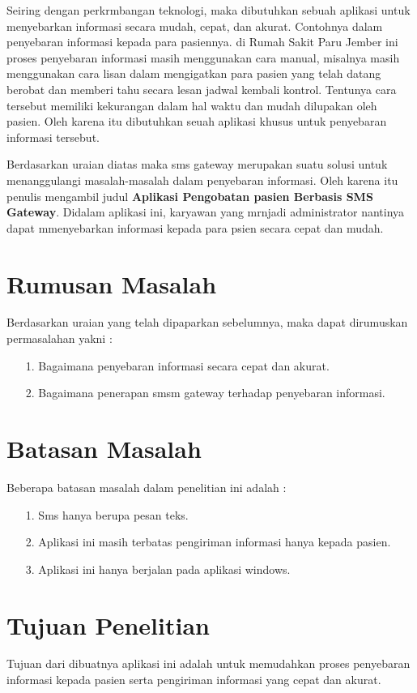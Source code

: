 \documentclass{jtetiproposalskripsi}
\begin{document}
Seiring dengan perkrmbangan teknologi, maka dibutuhkan sebuah aplikasi untuk menyebarkan informasi secara mudah, cepat, dan akurat. Contohnya dalam penyebaran informasi kepada para pasiennya. di Rumah Sakit Paru Jember ini proses penyebaran informasi masih menggunakan cara manual, misalnya masih menggunakan cara lisan dalam mengigatkan para pasien yang telah datang berobat dan memberi tahu secara lesan jadwal kembali kontrol. Tentunya cara tersebut  memiliki kekurangan dalam hal waktu dan mudah dilupakan oleh pasien. Oleh karena itu dibutuhkan seuah aplikasi khusus untuk penyebaran informasi tersebut.

Berdasarkan uraian diatas maka sms gateway merupakan  suatu solusi untuk menanggulangi masalah-masalah dalam penyebaran informasi. Oleh karena itu penulis mengambil judul \textbf{Aplikasi Pengobatan pasien Berbasis SMS Gateway}. Didalam aplikasi ini, karyawan yang mrnjadi administrator nantinya dapat mmenyebarkan informasi kepada para psien secara  cepat dan mudah.


\section{Rumusan Masalah}
Berdasarkan uraian yang telah dipaparkan sebelumnya, maka dapat dirumuskan permasalahan yakni :
\begin{itemize}
\item[1.]	Bagaimana penyebaran informasi secara cepat dan akurat.
\item[2.]	Bagaimana penerapan smsm gateway terhadap penyebaran informasi.
\end{itemize}



\section{Batasan Masalah}
Beberapa batasan masalah dalam penelitian ini adalah :
\begin{itemize}
\item[1.]	Sms hanya berupa pesan teks.
\item[2.]	Aplikasi ini masih terbatas pengiriman informasi hanya kepada pasien.
\item[3.]	Aplikasi ini hanya berjalan pada aplikasi windows.
\end{itemize}

\section{Tujuan Penelitian}
Tujuan dari dibuatnya aplikasi ini adalah untuk memudahkan proses penyebaran informasi kepada pasien serta pengiriman informasi yang cepat dan akurat.
\end{document}
